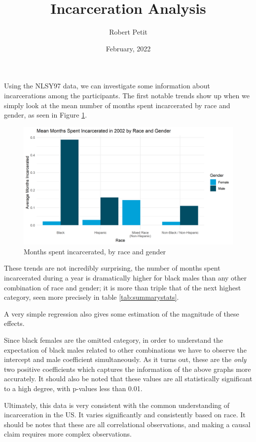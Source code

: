 \documentclass{article}
\title{Incarceration Analysis}
\author{Robert Petit}
\date{February, 2022}
\begin{document}
\maketitle

Using the NLSY97 data, we can investigate some information about incarcerations among the participants. The first notable trends show up when we simply look at the mean number of months spent incarcerated by race and gender, as seen in Figure \ref{fig:MeanMonths}. 

\begin{figure}[H]
    \begin{center}
        \includegraphics[width=.85\textwidth]{MonthsIncarcerated_by_racegender}
    \end{center}
    \caption{Months spent incarcerated, by race and gender}
    \label{fig:MeanMonths}
\end{figure}

These trends are not incredibly surprising, the number of months spent incarcerated during a year is dramatically higher for black males than any other combination of race and gender; it is more than triple that of the next highest category, seen more precisely in table  \ref{tab:summarystats}.



A very simple regression also gives some estimation of the magnitude of these effects.



Since black females are the omitted category, in order to understand the expectation of black males related to other combinations we have to observe the intercept and male coefficient simultaneously. As it turns out, these are the \emph{only} two positive coefficients which captures the information of the above graphs more accurately. It should also be noted that these values are all statistically significant to a high degree, with p-values less than 0.01.

Ultimately, this data is very consistent with the common understanding of incarceration in the US. It varies significantly and consistently based on race. It should be notes that these are all correlational observations, and making a causal claim requires more complex observations.
\end{document}
